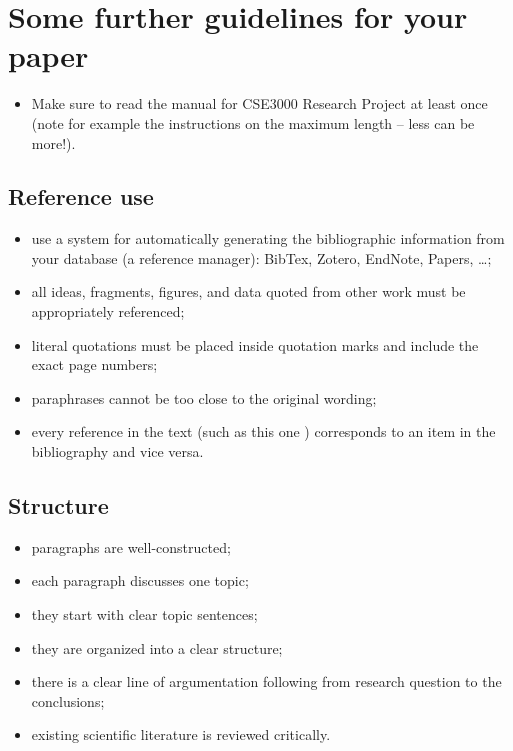 \appendix
\section{Some further guidelines for your paper}

\begin{itemize}
\item Make sure to read the manual for CSE3000 Research Project at least once (note for example the instructions on the maximum length -- less can be more!).
\end{itemize}

\subsection{Reference use}
\begin{itemize}
\item use a system for automatically generating the bibliographic information from your database (a reference manager): BibTex, Zotero, EndNote, Papers, \ldots;
\item all ideas, fragments, figures, and data quoted from other work must be appropriately referenced;
\item literal quotations must be placed inside quotation marks and include the exact page numbers;
\item paraphrases cannot be too close to the original wording;
\item every reference in the text (such as this one \cite{example}) corresponds to an item in the bibliography and vice versa.
\end{itemize}

\subsection{Structure}
\begin{itemize}
\item paragraphs are well-constructed;
\item each paragraph discusses one topic;
\item they start with clear topic sentences;
\item they are organized into a clear structure;
\item there is a clear line of argumentation following from research question to the conclusions;
\item existing scientific literature is reviewed critically.
\end{itemize}

